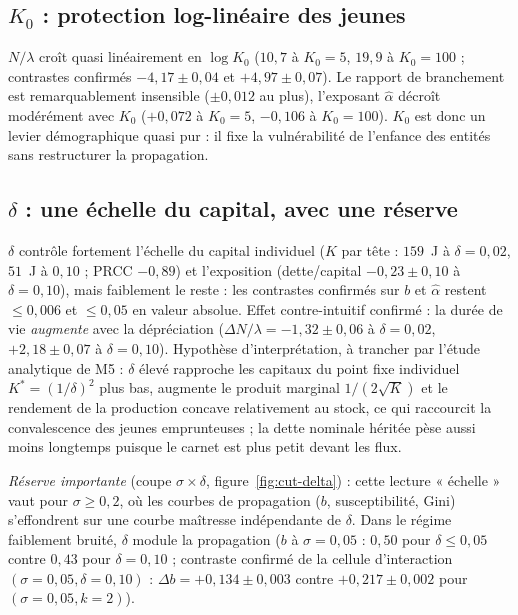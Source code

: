 \documentclass[11pt,a4paper]{article}
\begin{document}
\subsection{$K_0$ : protection log-linéaire des jeunes}

$N/\lambda$ croît quasi linéairement en $\log K_0$ ($10{,}7$ à
$K_0=5$, $19{,}9$ à $K_0=100$ ; contrastes confirmés
$-4{,}17\pm0{,}04$ et $+4{,}97\pm0{,}07$). Le rapport de branchement
est remarquablement insensible ($\pm0{,}012$ au plus), l'exposant
$\hat\alpha$ décroît modérément avec $K_0$ ($+0{,}072$ à $K_0=5$,
$-0{,}106$ à $K_0=100$). $K_0$ est donc un levier démographique quasi
pur : il fixe la vulnérabilité de l'enfance des entités sans
restructurer la propagation.

\subsection{$\delta$ : une échelle du capital, avec une réserve}
\label{sec:delta}

$\delta$ contrôle fortement l'échelle du capital individuel
($K$ par tête : $159$~J à $\delta=0{,}02$, $51$~J à $0{,}10$ ;
PRCC $-0{,}89$) et l'exposition (dette/capital $-0{,}23\pm0{,}10$ à
$\delta=0{,}10$), mais faiblement le reste : les contrastes confirmés
sur $b$ et $\hat\alpha$ restent $\le0{,}006$ et $\le0{,}05$ en valeur
absolue. Effet contre-intuitif confirmé : la durée de vie
\emph{augmente} avec la dépréciation ($\Delta N/\lambda=
-1{,}32\pm0{,}06$ à $\delta=0{,}02$, $+2{,}18\pm0{,}07$ à
$\delta=0{,}10$). Hypothèse d'interprétation, à trancher par l'étude
analytique de M5 : $\delta$ élevé rapproche les capitaux du point fixe
individuel $K^\ast=(1/\delta)^2$ plus bas, augmente le produit marginal
$1/(2\sqrt K)$ et le rendement de la production concave relativement au
stock, ce qui raccourcit la convalescence des jeunes emprunteuses ; la
dette nominale héritée pèse aussi moins longtemps puisque le carnet est
plus petit devant les flux.

\emph{Réserve importante} (coupe $\sigma\times\delta$,
figure~\ref{fig:cut-delta}) : cette lecture « échelle » vaut pour
$\sigma\ge0{,}2$, où les courbes de propagation ($b$, susceptibilité,
Gini) s'effondrent sur une courbe maîtresse indépendante de $\delta$.
Dans le régime faiblement bruité, $\delta$ module la propagation
($b$ à $\sigma=0{,}05$ : $0{,}50$ pour $\delta\le0{,}05$ contre
$0{,}43$ pour $\delta=0{,}10$ ; contraste confirmé de la cellule
d'interaction $(\sigma{=}0{,}05,\delta{=}0{,}10)$ :
$\Delta b=+0{,}134\pm0{,}003$ contre $+0{,}217\pm0{,}002$ pour
$(\sigma{=}0{,}05,k{=}2)$).
\end{document}

